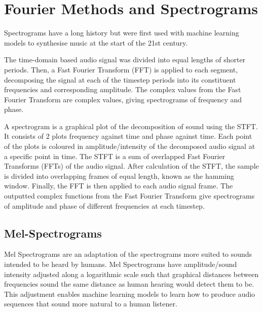 \section{Fourier Methods and Spectrograms}

Spectrograms have a long history but were first used with machine learning models to synthesise music at the start of the 21st century\cite{NoteOnsetDetection}.

The time-domain based audio signal was divided into equal lengths of shorter periods. Then, a Fast Fourier Transform (FFT) is applied to each segment, decomposing the signal at each of the timestep periods into its constituent frequencies and corresponding amplitude. The complex values from the Fast Fourier Transform are complex values, giving spectrograms of frequency and phase.

A spectrogram is a graphical plot of the decomposition of sound using the \acrfull{STFT}. It consists of 2 plots frequency against time and phase against time. Each point of the plots is coloured in amplitude/intensity of the decomposed audio signal at a specific point in time. The STFT is a sum of overlapped Fast Fourier Transforms (FFTs) of the audio signal. After calculation of the STFT, the sample is divided into overlapping frames of equal length, known as the hamming window. Finally, the FFT is then applied to each audio signal frame. The outputted complex functions from the Fast Fourier Transform give spectrograms of amplitude and phase of different frequencies at each timestep.

\subsection{Mel-Spectrograms}

Mel Spectrograms are an adaptation of the spectrograms more suited to sounds intended to be heard by humans. Mel Spectrograms have amplitude/sound intensity adjusted along a logarithmic scale such that graphical distances between frequencies sound the same distance as human hearing would detect them to be. This adjustment enables machine learning models to learn how to produce audio sequences that sound more natural to a human listener.


